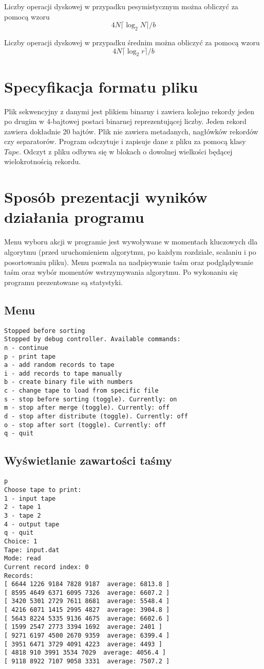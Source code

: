 \documentclass{article}
\begin{document}
Liczby operacji dyskowej w przypadku pesymistycznym można obliczyć za pomocą wzoru
$$ 4N \lceil \log_2 N \rceil / b$$

Liczby operacji dyskowej w przypadku średnim można obliczyć za pomocą wzoru
$$ 4N \lceil \log_2 r \rceil / b$$

\section{Specyfikacja formatu pliku}
Plik sekwencyjny z danymi jest plikiem binarny i zawiera kolejno rekordy jeden po drugim w 4-bajtowej postaci binarnej reprezentującej liczby. Jeden rekord zawiera dokładnie 20 bajtów. Plik nie zawiera metadanych, nagłówków rekordów czy separatorów. Program odczytuje i zapisuje dane z pliku za pomocą klasy $Tape$. Odczyt z pliku odbywa się w blokach o dowolnej wielkości będącej wielokrotnością rekordu.

\section{Sposób prezentacji wyników działania programu}
Menu wyboru akcji w programie jest wywoływane w momentach kluczowych dla algorytmu (przed uruchomieniem algorytmu, po każdym rozdziale, scalaniu i po posortowaniu pliku). Menu pozwala na nadpisywanie taśm oraz podglądywanie taśm oraz wybór momentów wstrzymywania algorytmu. Po wykonaniu się programu prezentowane są statystyki.

\subsection{Menu}
\begin{lstlisting}
Stopped before sorting
Stopped by debug controller. Available commands:
n - continue
p - print tape
a - add random records to tape
i - add records to tape manually
b - create binary file with numbers
c - change tape to load from specific file
s - stop before sorting (toggle). Currently: on
m - stop after merge (toggle). Currently: off
d - stop after distribute (toggle). Currently: off
o - stop after sort (toggle). Currently: off
q - quit
\end{lstlisting}

\subsection{Wyświetlanie zawartości taśmy}
\begin{lstlisting}
p
Choose tape to print:
1 - input tape
2 - tape 1
3 - tape 2
4 - output tape
q - quit
Choice: 1
Tape: input.dat
Mode: read
Current record index: 0
Records: 
[ 6644 1226 9184 7828 9187  average: 6813.8 ]
[ 8595 4649 6371 6095 7326  average: 6607.2 ]
[ 3420 5301 2729 7611 8681  average: 5548.4 ]
[ 4216 6071 1415 2995 4827  average: 3904.8 ]
[ 5643 8224 5335 9136 4675  average: 6602.6 ]
[ 1599 2547 2773 3394 1692  average: 2401 ]
[ 9271 6197 4500 2670 9359  average: 6399.4 ]
[ 3951 6471 3729 4091 4223  average: 4493 ]
[ 4818 910 3991 3534 7029  average: 4056.4 ]
[ 9118 8922 7107 9058 3331  average: 7507.2 ]
\end{lstlisting}
\end{document}
